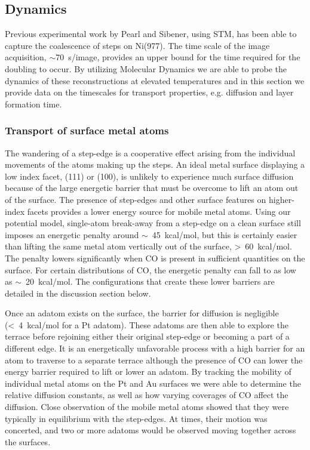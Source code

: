 \documentclass[journal = jpccck, manuscript = article]{achemso}
\begin{document}
\subsection{Dynamics}
Previous experimental work by Pearl and Sibener\cite{Pearl}, using
STM, has been able to capture the coalescence of steps on Ni(977). The
time scale of the image acquisition, $\sim$70~s/image, provides an
upper bound for the time required for the doubling to occur. By
utilizing Molecular Dynamics we are able to probe the dynamics of
these reconstructions at elevated temperatures and in this section we
provide data on the timescales for transport properties,
e.g. diffusion and layer formation time.


\subsubsection{Transport of surface metal atoms}

The wandering of a step-edge is a cooperative effect arising from the
individual movements of the atoms making up the steps. An ideal metal
surface displaying a low index facet, (111) or (100), is unlikely to
experience much surface diffusion because of the large energetic
barrier that must be overcome to lift an atom out of the surface. The
presence of step-edges and other surface features on higher-index
facets provides a lower energy source for mobile metal atoms.  Using
our potential model, single-atom break-away from a step-edge on a
clean surface still imposes an energetic penalty around
$\sim$~45~kcal/mol, but this is certainly easier than lifting the same
metal atom vertically out of the surface, \textgreater~60~kcal/mol.
The penalty lowers significantly when CO is present in sufficient
quantities on the surface. For certain distributions of CO, the
energetic penalty can fall to as low as $\sim$~20~kcal/mol. The
configurations that create these lower barriers are detailed in the
discussion section below.

Once an adatom exists on the surface, the barrier for diffusion is
negligible (\textless~4~kcal/mol for a Pt adatom). These adatoms are
then able to explore the terrace before rejoining either their
original step-edge or becoming a part of a different edge. It is an
energetically unfavorable process with a high barrier for an atom to
traverse to a separate terrace although the presence of CO can lower
the energy barrier required to lift or lower an adatom. By tracking
the mobility of individual metal atoms on the Pt and Au surfaces we
were able to determine the relative diffusion constants, as well as
how varying coverages of CO affect the diffusion. Close observation of
the mobile metal atoms showed that they were typically in equilibrium
with the step-edges.  At times, their motion was concerted, and two or
more adatoms would be observed moving together across the surfaces.
\end{document}
